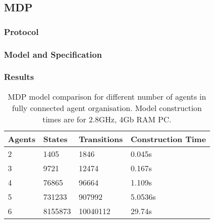 \documentclass{llncs}
\begin{document}
\clearpage

\subsection{MDP}
\subsubsection{Protocol}
\subsubsection{Model and Specification}
\subsubsection{Results}
\begin{table}
 \centering
 \begin{tabular}{ | l | l | l | l |}
    \hline
    Agents & States & Transitions & Construction Time \\ \hline
    2 & 1405 & 1846 & 0.045s  \\ \hline
    3 & 9721 & 12474 & 0.167s \\ \hline
    4 & 76865 & 96664 & 1.109s \\ \hline
    5 & 731233 & 907992 & 5.0536s \\ \hline
    6 & 8155873 & 10040112 & 29.74s \\ \hline
\end{tabular}
\caption{MDP model comparison for different number of agents in fully connected agent organisation. Model construction times are for 2.8GHz, 4Gb RAM PC.}
\end{table}

\begin{table}
\centering
{}
\caption{Maximal rewards that can be achieved by agent organisations from figure \ref{fig:network_configurations} using algorithm \ref{alg:join_team_nondet}'s offline and online versions defined in algorithm \ref{alg:main_process}.}
\end{table}
\end{document}
